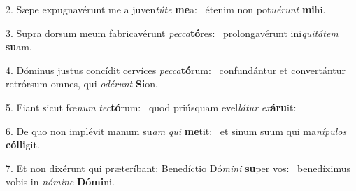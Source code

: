 2. Sæpe expugnavérunt me a juven\textit{tú}\textit{te} \textbf{me}a: \ast\  étenim non pot\textit{u}\textit{é}\textit{runt} \textbf{mi}hi.\

3. Supra dorsum meum fabricavérunt \textit{pec}\textit{ca}\textbf{tó}res: \ast\  prolongavérunt ini\textit{qui}\textit{tá}\textit{tem} \textbf{su}am.\

4. Dóminus justus concídit cervíces \textit{pec}\textit{ca}\textbf{tó}rum: \ast\  confundántur et convertántur retrórsum omnes, qui \textit{o}\textit{dé}\textit{runt} \textbf{Si}on.\

5. Fiant sicut fœ\textit{num} \textit{tec}\textbf{tó}rum: \ast\  quod priúsquam evel\textit{lá}\textit{tur} \textit{ex}\textbf{á}\textbf{ru}it:\

6. De quo non implévit manum su\textit{am} \textit{qui} \textbf{me}tit: \ast\  et sinum suum qui ma\textit{ní}\textit{pu}\textit{los} \textbf{cól}\textbf{li}git.\

7. Et non dixérunt qui præteríbant: Benedíctio Dó\textit{mi}\textit{ni} \textbf{su}per vos: \ast\  benedíximus vobis in \textit{nó}\textit{mi}\textit{ne} \textbf{Dó}\textbf{mi}ni.\

